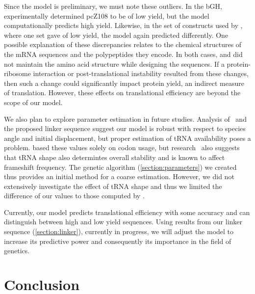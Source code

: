 \documentclass[12pt]{article}
\begin{document}
Since the model is preliminary, we must note these outliers.  In the
bGH, \citeauthor{schoner:bgh} experimentally determined pcZ108 to be
of low yield, but the model computationally predicts high yield.
Likewise, in the set of constructs used by \citet{weiss87}, where one
set gave of low yield, the model again predicted differently.  One
possible explanation of these discrepancies relates to the chemical
structures of the mRNA sequences and the polypeptides they
encode.  In both cases, \citeauthor{weiss87} and
\citeauthor{schoner:bgh} did not maintain the amino
acid structure while designing the sequences. If a protein-ribosome
interaction or post-translational instability resulted from these
changes, then such a change could significantly impact protein yield, an
indirect measure of translation. However, these effects on
translational efficiency are beyond the scope of our model.

We also plan to explore parameter estimation in future studies.
Analysis of \prfB\ and the
proposed linker sequence suggest our model is robust with respect to species angle
and initial displacement, but proper estimation of tRNA availability
poses a problem. \citet{lalit:mechanics} based these values solely on 
codon usage, but research~\cite{phelps} also suggests that tRNA shape
also determintes overall stability and is known to affect
frameshift frequency. The
genetic algorithm (\autoref{section:parameters}) we created thus
provides an initial method for a coarse estimation. However, we did
not extensively investigate the effect of tRNA shape and thus we limited the
difference of our values to those computed by \citeauthor{lalit:mechanics}.

Currently, our model predicts translational efficiency with some
accuracy and can distinguish between high and low yield sequences. 
Using results from our linker sequence (\autoref{section:linker}), 
currently in progress, we will adjust the model to increase its 
predictive power and consequently its importance in the field of 
genetics.

\section{Conclusion}
\label{section:conclusion}
\end{document}
